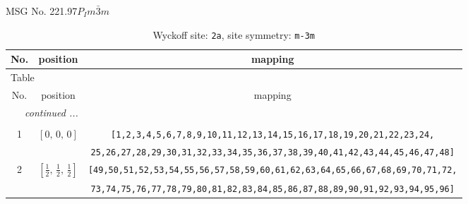 \documentclass[fleqn,8pt]{jsarticle}
\begin{document}
\setcounter{MaxMatrixCols}{32}

\renewcommand{\tablename}{Table~}
\renewcommand{\figurename}{Figure~}
\begin{center}
\LARGE
MSG No. 221.97\quad$P_{I}m\bar{3}m$
\end{center}
\renewcommand{\arraystretch}{1.2}
\begin{longtable}{ccc}
\caption{Wyckoff site: {\tt 2a}, site symmetry: {\tt m-3m}}
 \\
 \hline \hline
No. & position & mapping \\ \hline \endfirsthead

\multicolumn{2}{l}{\tablename\ \thetable{}} \\
 \hline \hline
No. & position & mapping \\ \hline \endhead

 \hline \hline
\multicolumn{2}{r}{\footnotesize\it continued ...} \\ \endfoot

 \hline \hline
\multicolumn{2}{r}{} \\ \endlastfoot

1 & $\left[ 0,\, 0,\, 0 \right]$ & {\tt [1,2,3,4,5,6,7,8,9,10,11,12,13,14,15,16,17,18,19,20,21,22,23,24,} \\ \hline
 &  & {\tt 25,26,27,28,29,30,31,32,33,34,35,36,37,38,39,40,41,42,43,44,45,46,47,48]} \\ \hline
2 & $\left[ \frac{1}{2},\, \frac{1}{2},\, \frac{1}{2} \right]$ & {\tt [49,50,51,52,53,54,55,56,57,58,59,60,61,62,63,64,65,66,67,68,69,70,71,72,} \\ \hline
 &  & {\tt 73,74,75,76,77,78,79,80,81,82,83,84,85,86,87,88,89,90,91,92,93,94,95,96]} \\
\end{longtable}
\renewcommand{\arraystretch}{1.2}
\end{document}
